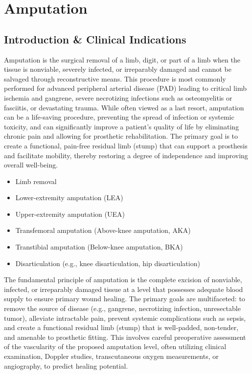 \chapter{Amputation}

\section*{Introduction \& Clinical Indications}
Amputation is the surgical removal of a limb, digit, or part of a limb when the tissue is nonviable, severely infected, or irreparably damaged and cannot be salvaged through reconstructive means. This procedure is most commonly performed for advanced peripheral arterial disease (PAD) leading to critical limb ischemia and gangrene, severe necrotizing infections such as osteomyelitis or fasciitis, or devastating trauma. While often viewed as a last resort, amputation can be a life-saving procedure, preventing the spread of infection or systemic toxicity, and can significantly improve a patient's quality of life by eliminating chronic pain and allowing for prosthetic rehabilitation. The primary goal is to create a functional, pain-free residual limb (stump) that can support a prosthesis and facilitate mobility, thereby restoring a degree of independence and improving overall well-being.

\begin{itemize}
  \item Limb removal
  \item Lower-extremity amputation (LEA)
  \item Upper-extremity amputation (UEA)
  \item Transfemoral amputation (Above-knee amputation, AKA)
  \item Transtibial amputation (Below-knee amputation, BKA)
  \item Disarticulation (e.g., knee disarticulation, hip disarticulation)
\end{itemize}

The fundamental principle of amputation is the complete excision of nonviable, infected, or irreparably damaged tissue at a level that possesses adequate blood supply to ensure primary wound healing. The primary goals are multifaceted: to remove the source of disease (e.g., gangrene, necrotizing infection, unresectable tumor), alleviate intractable pain, prevent systemic complications such as sepsis, and create a functional residual limb (stump) that is well-padded, non-tender, and amenable to prosthetic fitting. This involves careful preoperative assessment of the vascularity of the proposed amputation level, often utilizing clinical examination, Doppler studies, transcutaneous oxygen measurements, or angiography, to predict healing potential.

